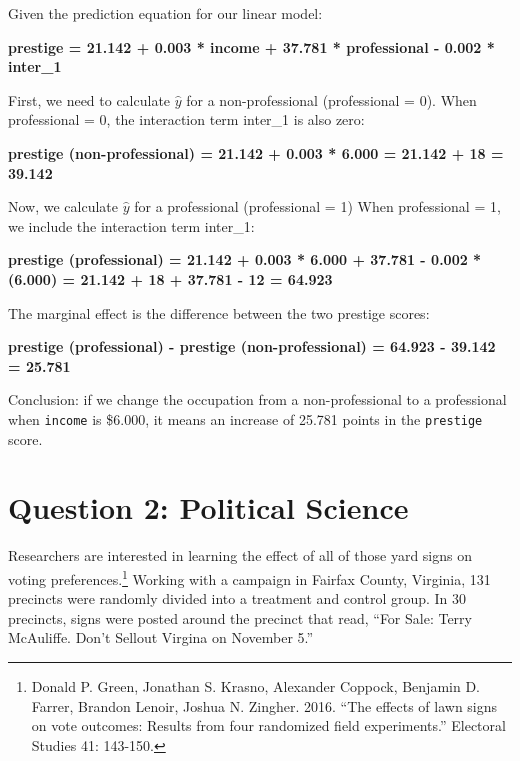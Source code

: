 \documentclass[12pt,letterpaper]{article}
\begin{document}
\begin{enumerate}
	Given the prediction equation for our linear model: 
	
	\textbf{prestige = 21.142 + 0.003 * income + 37.781 * professional - 0.002 * inter\_1}
	\vspace{.4cm}

	
	
	First, we need to calculate $\hat{y}$ for a non-professional (professional = 0). 
	When professional = 0, the interaction term  inter\_1 is also zero:

	\textbf{prestige (non-professional) = 21.142 + 0.003 * 6.000  =  21.142 + 18 = 39.142}
	\vspace{.4cm}

	
	
	Now, we calculate $\hat{y}$ for a professional (professional = 1)
	When professional = 1, we include the interaction term inter\_1:

	\textbf{prestige (professional) = 21.142 + 0.003 * 6.000 + 37.781 - 0.002 *(6.000) = 21.142 + 18 + 37.781 - 12 = 64.923}
	\vspace{.4cm}

	
	
	The marginal effect is the difference between the two prestige scores: 
	
	\textbf{prestige (professional) - prestige (non-professional) = 64.923 - 39.142 = 25.781}
	\vspace{.4cm}


	
	Conclusion: if we change the occupation from a non-professional to a professional when \texttt{income} is \$6.000, it means an increase of 25.781 points in the \texttt{prestige} score.
	

	
\end{enumerate}

\newpage

\section*{Question 2: Political Science}
\vspace{.25cm}
\noindent 	Researchers are interested in learning the effect of all of those yard signs on voting preferences.\footnote{Donald P. Green, Jonathan	S. Krasno, Alexander Coppock, Benjamin D. Farrer,	Brandon Lenoir, Joshua N. Zingher. 2016. ``The effects of lawn signs on vote outcomes: Results from four randomized field experiments.'' Electoral Studies 41: 143-150. } Working with a campaign in Fairfax County, Virginia, 131 precincts were randomly divided into a treatment and control group. In 30 precincts, signs were posted around the precinct that read, ``For Sale: Terry McAuliffe. Don't Sellout Virgina on November 5.'' \\
\end{document}
